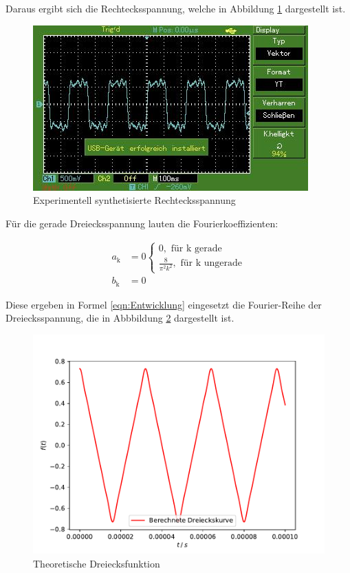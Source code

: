 Daraus ergibt sich die Rechtecksspannung, welche in Abbildung \ref{fig:Ex2}
dargestellt ist.

\begin{figure}[H]
    \centering
    \includegraphics[scale=0.7]{content/recht.jpg}
    \caption{Experimentell synthetisierte Rechtecksspannung}
    \label{fig:Ex2}
\end{figure}


Für die gerade Dreiecksspannung lauten die Fourierkoeffizienten:

\begin{align*}
    a_\text{k} &= 0 
        \begin{cases} 
            0, \text{ für k gerade} \\ \frac{8}{\pi^2 k^2}, \text{ für k ungerade}
        \end{cases} \\
    b_\text{k} &= 0
\end{align*}

Diese ergeben in Formel \eqref{eqn:Entwicklung} eingesetzt die Fourier-Reihe
der Dreiecksspannung, die in Abbbildung \ref{fig:Theo3}  dargestellt ist.

\begin{figure}[H]
    \centering
    \includegraphics[scale = 0.6]{content/plot6.pdf}
    \caption{Theoretische Dreiecksfunktion}
    \label{fig:Theo3}
\end{figure}


